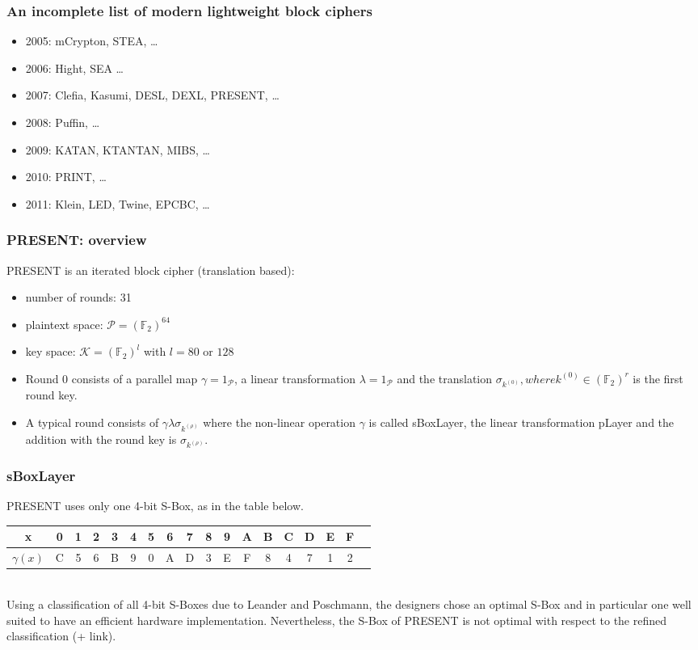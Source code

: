 \documentclass[a4paper, 10pt, titlepage]{article}
\begin{document}
\subsubsection*{An incomplete list of modern lightweight block ciphers}
\begin{itemize}
\item 2005: mCrypton, STEA, \dots
\item 2006: Hight, SEA \dots
\item 2007: Clefia, Kasumi, DESL, DEXL, PRESENT, \dots
\item 2008: Puffin, \dots
\item 2009: KATAN, KTANTAN, MIBS, \dots
\item 2010: PRINT, \dots
\item 2011: Klein, LED, Twine, EPCBC, \dots
\end{itemize}

\subsubsection*{PRESENT: overview}
PRESENT is an iterated block cipher (translation based):
\begin{itemize}
\item number of rounds: 31
\item plaintext space: $\mathcal{P} = (\mathbb{F}_2)^{64}$
\item key space: $\mathcal{K} = (\mathbb{F}_2)^l$ with $l = 80$ or $128$
\item Round 0 consists of a parallel map $\gamma = 1_{\mathcal{P}}$, a linear transformation $\lambda = 1_{\mathcal{P}}$ and the translation $\sigma_{k^{(0)}}, where k^{(0)} \in (\mathbb{F}_2)^r$ is the first round key.
\item A typical round consists of $\gamma \lambda \sigma_{k^{(\rho)}}$ where the non-linear operation $\gamma$ is called sBoxLayer, the linear transformation pLayer and the addition with the round key is $\sigma_{k^{(\rho)}}$.
\end{itemize}
\subsubsection*{sBoxLayer}
PRESENT uses only one 4-bit S-Box, as in the table below. \medskip \\
\begin{tabular}{|c||c|c|c|c|c|c|c|c|c|c|c|c|c|c|c|c|c|} \hline
x & 0 & 1& 2& 3& 4& 5& 6& 7& 8& 9& A& B& C& D& E& F \\ \hline
$\gamma(x)$ & C &5 &6 &B &9 &0 &A &D &3 &E &F &8 &4 &7 &1 &2 \\ \hline
\end{tabular} \medskip \\
Using a classification of all 4-bit S-Boxes due to Leander and Poschmann, the designers chose an optimal S-Box and in particular one well suited to have an efficient hardware implementation.
Nevertheless, the S-Box of PRESENT is not optimal with respect to the refined classification (+ link).
\end{document}
